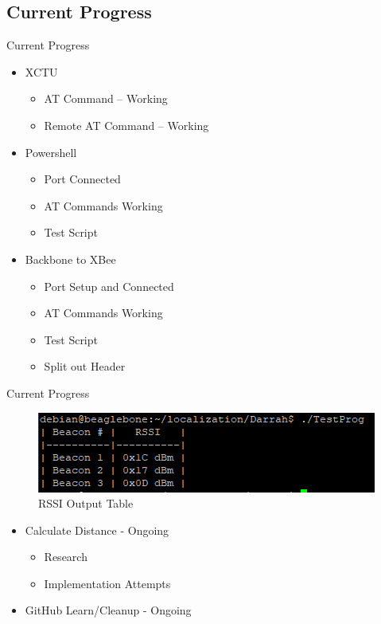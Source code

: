 \documentclass{beamer}
\begin{document}
\subsection{Current Progress}
\begin{frame}{Current Progress}
    \begin{itemize}
    
    \item XCTU
    \begin{itemize}
        \item AT Command -- Working
        \item Remote AT Command -- Working
    \end{itemize}
    
    \item Powershell
    \begin{itemize}
        \item Port Connected
        \item AT Commands Working
        \item Test Script
    \end{itemize}
    
    \item Backbone to XBee
    \begin{itemize}
        \item Port Setup and Connected
        \item AT Commands Working
        \item Test Script
        \item Split out Header
    \end{itemize}
    
    \end{itemize}
\end{frame}

\begin{frame}{Current Progress}
    \begin{figure}
    \centering
    \includegraphics[scale=0.9]{figs/inkscape/RSSIOutputTable.PNG}
    \caption{RSSI Output Table}
    \label{fig:RSSIOutputTable}
    \end{figure}
    
    \begin{itemize}
    \item Calculate Distance - Ongoing
    \begin{itemize}
        \item Research
        \item Implementation Attempts
    \end{itemize}
    \item GitHub Learn/Cleanup - Ongoing
    \end{itemize}
\end{frame}
\end{document}
